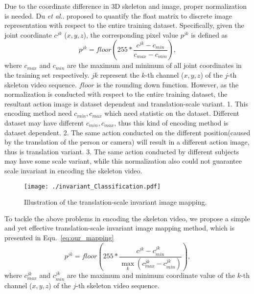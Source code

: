 \documentclass[10pt,journal]{IEEEtran}
\makeatletter
\DeclareRobustCommand\onedot{\futurelet\@let@token\@onedot}
\def\@onedot{\ifx\@let@token.\else.\null\fi\xspace}
\def\etal{\emph{et al}\onedot}
\makeatother
\begin{document}
Due to the coordinate difference in 3D skeleton and image, proper normalization is needed. Du \etal \cite{Yong2015Skeleton} proposed to quantify the float matrix to discrete image representation with respect to the entire training dataset. Specifically, given the joint coordinate $c^{jk}$ ($x,y,z$), the corresponding pixel value $p^{jk}$ is defined as
\begin{equation}
\label{softmax}
p^{jk} = floor\left(255 * \frac{c^{jk}-c_{min}}{c_{max}-c_{min}}\right),
\end{equation}
where $c_{max}$ and $c_{min}$ are the maximum and minimum of all joint coordinates in the training set respectively. $jk$ represent the $k$-th channel ($x,y,z$) of the $j$-th skeleton video sequence. $floor$ is the rounding down function. However, as the normalization is conducted with respect to the entire training dataset, the resultant action image is dataset dependent and translation-scale variant.  1. This encoding method need $c_{min}, c_{max}$ which need statistic on the dataset. Different dataset may have different $c_{min}, c_{max}$, thus this kind of encoding method is dataset dependent. 2. The same action conducted on the different position(caused by the translation of the person or camera) will result in a different action image, thus is translation variant. 3. The same action conducted by different subjects may have some scale variant, while this normalization also could not guarantee scale invariant in encoding the skeleton video.


\begin{figure}[htb]
\centering
\texttt{[image: ./invariant\_Classification.pdf]}
\caption{Illustration of the translation-scale invariant image mapping.}
\label{fig:map}
\end{figure}

To tackle the above problems in encoding the skeleton video, we propose a simple and yet effective translation-scale invariant image mapping method, which is presented in Equ.~\ref{eq:our_mapping}
\begin{equation}
\label{eq:our_mapping}
p^{jk} = floor\left(255 * \frac{c^{jk}-c^{jk}_{min}}{\max\limits_{k}(c^{jk}_{max}-c^{jk}_{min})}\right),
\end{equation}
where $c^{jk}_{max}$ and $c^{jk}_{min}$ are the maximum and minimum coordinate value of the $k$-th channel ($x,y,z$) of the $j$-th skeleton video sequence.
\end{document}
